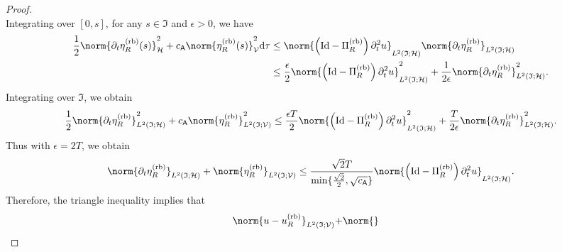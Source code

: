 \begin{proof}
\begin{equation}
\end{equation}
Integrating over $[0,s]$, for any $s \in  \mathfrak{I}$ and $\epsilon>0$, we have
\begin{equation}
\begin{aligned}
   \frac{1}{2} \norm{	
        \partial_t
        \eta^{\text{(rb)}}_R(s)
    }^2_{\mathcal{H}}
	+
	c_{\mathsf{A}}
	\norm{
		\eta^{\text{(rb)}}_R(s)
	}^2_{\mathcal{V}}
	\text{d}\tau
    &
	\leq
    \norm{
    \left(
        \text{Id}
        -
        \Pi^{\text{(rb)}}_R
    \right) \partial^2_t u
    }_{L^2(\mathfrak{I};\mathcal{H})}
	\norm{
		\partial_t \eta^{\text{(rb)}}_R
	}_{L^2(\mathfrak{I};\mathcal{H})}
    \\
    &
    \leq
    \frac{\epsilon}{2}
    \norm{
    \left(
        \text{Id}
        -
       \Pi^{\text{(rb)}}_R
    \right) \partial^2_t u
    }^2_{L^2(\mathfrak{I};\mathcal{H})}
	+
    \frac{1}{2\epsilon}
    \norm{
		\partial_t \eta^{\text{(rb)}}_R
	}^2_{L^2(\mathfrak{I};\mathcal{H})}.
\end{aligned}
\end{equation}
Integrating over $\mathfrak{I}$, we obtain
\begin{equation}
   \frac{1}{2}  \norm{	
        \partial_t
        \eta^{\text{(rb)}}_R
    }^2_{L^2(\mathfrak{I};\mathcal{H})}
	+
	c_{\mathsf{A}}
	\norm{
		\eta^{\text{(rb)}}_R
	}^2_{L^2(\mathfrak{I};\mathcal{V})}
    \leq
    \frac{\epsilon T}{2}
    \norm{
    \left(
        \text{Id}
        -
       \Pi^{\text{(rb)}}_R
    \right) \partial^2_t u
    }^2_{L^2(\mathfrak{I};\mathcal{H})}
	+
    \frac{T}{2\epsilon}
    \norm{
		\partial_t \eta^{\text{(rb)}}_R
	}^2_{L^2(\mathfrak{I};\mathcal{H})}.
\end{equation}
Thus with $\epsilon=2T$, we obtain
\begin{equation}\label{eq:bound_eta_rb}
    \norm{	
        \partial_t
        \eta^{\text{(rb)}}_R
    }_{L^2(\mathfrak{I};\mathcal{H})}
	+
	\norm{
		\eta^{\text{(rb)}}_R
	}_{L^2(\mathfrak{I};\mathcal{V})}
    \leq
    \frac{\sqrt{2}T}{\min\{\frac{\sqrt{2}}{2} ,\sqrt{ c_{\mathsf{A}}}\}}
    \norm{
        \left(
            \text{Id}
            -
            \Pi^{\text{(rb)}}_R
        \right) \partial^2_t u
    }_{L^2(\mathfrak{I};\mathcal{H})}.
\end{equation}
Therefore, the triangle inequality implies that
\begin{equation}
\begin{aligned}
	\norm{
		u
		-
		u^{\normalfont\text{(rb)}}_R
	}_{L^2(\mathfrak{I};\mathcal{V})}
    +
    &
	\norm{
}
\end{aligned}
\end{equation}
\end{proof}
